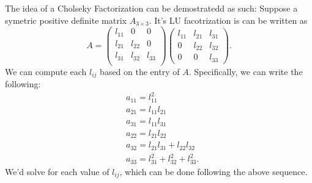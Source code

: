 \documentclass[5pt, a4paper]{article}
\begin{document}
The idea of a Cholseky Factorization can be demostratedd as such: Suppose a
symetric positive definite matrix $A_{3\times 3}$. It's LU facotrization is can be written
as \[
    A = \begin{pmatrix} 
    l_{11} & 0 & 0 \\ 
    l_{21} & l_{22} & 0 \\
    l_{31} & l_{32} & l_{33} \\
\end{pmatrix} 
\begin{pmatrix} 
    l_{11} & l_{21} & l_{31} \\ 
    0 & l_{22} & l_{32} \\
    0 & 0 &l_{33}    
\end{pmatrix} 
.\] 
We can compute each $l_{ij}$ based on the entry of $A$. Specifically, we can
write the following: 
\begin{align*}
    &a_{11} = l_{11}^2 \\
    &a_{21} = l_{11}l_{21} \\
    & a_{31} = l_{11}l_{31} \\
    & a_{22} = l_{21}l_{22} \\
    & a_{32} = l_{21}l_{31} + l_{22}l_{32} \\
    &a_{33} = l_{31}^2 + l_{32}^2 + l_{33}^2 
.\end{align*}
We'd solve for each value of $l_{ij}$, which can be done following the above
sequence.
\end{document}
